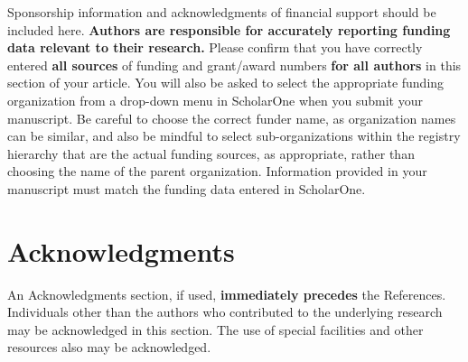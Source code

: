 \documentclass[journal]{new-aiaa}
\begin{document}
Sponsorship information and acknowledgments of financial support should be included here. \textbf{Authors are responsible for accurately reporting funding data relevant to their research.} Please confirm that you have correctly entered \textbf{all sources} of funding and grant/award numbers \textbf{for all authors} in this section of your article. You will also be asked to select the appropriate funding organization from a drop-down menu in ScholarOne when you submit your manuscript. Be careful to choose the correct funder name, as organization names can be similar, and also be mindful to select sub-organizations within the registry hierarchy that are the actual funding sources, as appropriate, rather than choosing the name of the parent organization. Information provided in your manuscript must match the funding data entered in ScholarOne.

\section*{Acknowledgments}
An Acknowledgments section, if used, \textbf{immediately precedes} the References. Individuals other than the authors who contributed to the underlying research may be acknowledged in this section. The use of special facilities and other resources also may be acknowledged. 


\end{document}
